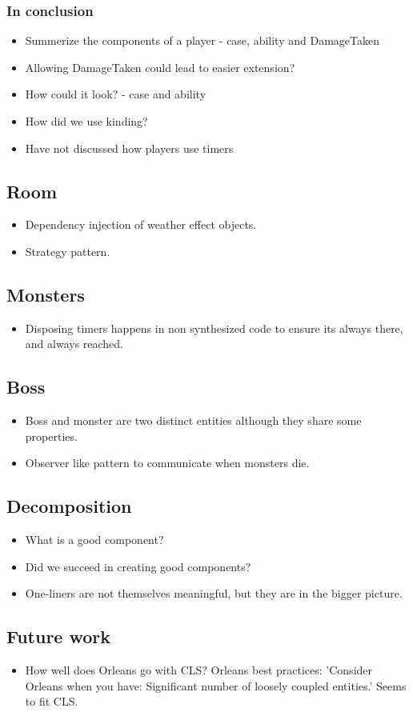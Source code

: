 \subsubsection{In conclusion}
\begin{itemize}
	\item Summerize the components of a player - case, ability and DamageTaken
	\item Allowing DamageTaken could lead to easier extension?
	\item How could it look? - case and ability
	\item How did we use kinding?
	\item Have not discussed how players use timers
\end{itemize}   

\subsection{Room}
\begin{itemize}
	\item Dependency injection of weather effect objects.
	\item Strategy pattern.
\end{itemize}

\subsection{Monsters}
\begin{itemize}
	\item Disposing timers happens in non synthesized code to ensure its always there, and always reached.
\end{itemize}

\subsection{Boss}
\begin{itemize}
	\item Boss and monster are two distinct entities although they share some properties.
	\item Observer like pattern to communicate when monsters die.
\end{itemize}

\subsection{Decomposition}
\begin{itemize}
	\item What is a good component?
	\item Did we succeed in creating good components?
	\item One-liners are not themselves meaningful, but they are in the bigger picture.
\end{itemize}

\subsection{Future work}
\begin{itemize}
	\item How well does Orleans go with CLS? Orleans best practices: 'Consider Orleans when you have: Significant number of loosely coupled entities.' Seems to fit CLS. 
\end{itemize}